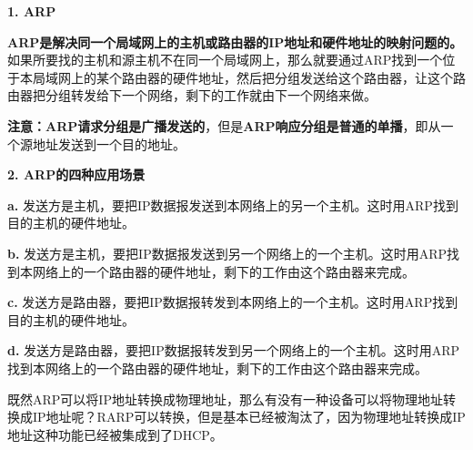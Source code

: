 \textbf{{1. ARP}}

\textbf{{ARP是解决同一个局域网上的主机或路由器的IP地址和硬件地址的映射问题的。}}如果所要找的主机和源主机不在同一个局域网上，那么就要通过ARP找到一个位于本局域网上的某个路由器的硬件地址，然后把分组发送给这个路由器，让这个路由器把分组转发给下一个网络，剩下的工作就由下一个网络来做。

{\textbf{注意：}}\textbf{{ARP请求分组是广播}{发送的}}，但是\textbf{ARP响应分组是普通的单播}，即从一个源地址发送到一个目的地址。

{\textbf{2. ARP的四种应用场景}}

\textbf{a.}
发送方是主机，要把IP数据报发送到本网络上的另一个主机。这时用ARP找到目的主机的硬件地址。

\textbf{b.}
发送方是主机，要把IP数据报发送到另一个网络上的一个主机。这时用ARP找到本网络上的一个路由器的硬件地址，剩下的工作由这个路由器来完成。

\textbf{c.}
发送方是路由器，要把IP数据报转发到本网络上的一个主机。这时用ARP找到目的主机的硬件地址。

\textbf{d.}
发送方是路由器，要把IP数据报转发到另一个网络上的一个主机。这时用ARP找到本网络上的一个路由器的硬件地址，剩下的工作由这个路由器来完成。

既然ARP可以将IP地址转换成物理地址，那么有没有一种设备可以将物理地址转换成IP地址呢？RARP可以转换，但是基本已经被淘汰了，因为物理地址转换成IP地址这种功能已经被集成到了DHCP。
